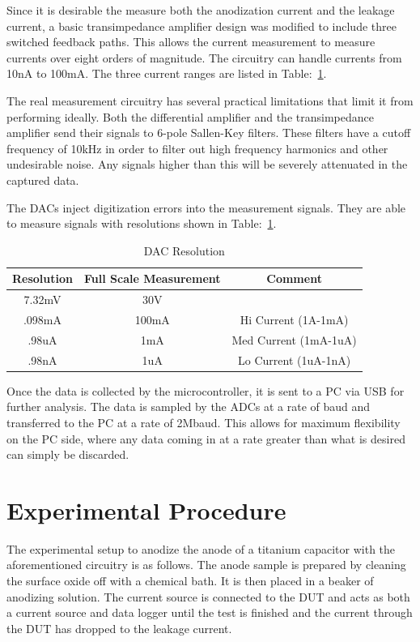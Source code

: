 \documentclass[journal]{IEEEtran}
\begin{document}
Since it is desirable the measure both the anodization current and the leakage current, a basic transimpedance amplifier design was modified to include three switched feedback paths. This allows the current measurement to measure currents over eight orders of magnitude. The circuitry can handle currents from 10nA to 100mA. The three current ranges are listed in Table:~\ref{tab:dacRes}.

The real measurement circuitry has several practical limitations that limit it from performing ideally. Both the differential amplifier and the transimpedance amplifier send their signals to 6-pole Sallen-Key filters. These filters have a cutoff frequency of 10kHz\cite{sThesis} in order to filter out high frequency harmonics and other undesirable noise. Any signals higher than this will be severely attenuated in the captured data.

The DACs inject digitization errors into the measurement signals. They are able to measure signals with resolutions shown in Table:~\ref{tab:dacRes}.


\begin{table}[here]
\renewcommand{\arraystretch}{1.3}
\caption{DAC Resolution}
\label{tab:dacRes}
\centering
\begin{tabular}{c|c|c}
\hline
\bfseries Resolution & \bfseries Full Scale Measurement & \bfseries Comment\\
\hline\hline
7.32mV & 30V & \\
\hline
.098mA & 100mA & Hi Current (1A-1mA)\\
\hline
.98uA & 1mA & Med Current (1mA-1uA) \\
\hline
.98nA & 1uA & Lo Current (1uA-1nA)\\
\hline
\end{tabular}
\end{table}

Once the data is collected by the microcontroller, it is sent to a PC via USB for further analysis. The data is sampled by the ADCs at a rate of baud and transferred to the PC at a rate of 2Mbaud. This allows for maximum flexibility on the PC side, where any data coming in at a rate greater than what is desired can simply be discarded.

\section{Experimental Procedure}
The experimental setup to anodize the anode of a titanium capacitor with the aforementioned circuitry is as follows. The anode sample is prepared by cleaning the surface oxide off with a chemical bath. It is then placed in a beaker of anodizing solution. The current source is connected to the DUT and acts as both a current source and data logger until the test is finished and the current through the DUT has dropped to the leakage current.
\end{document}
